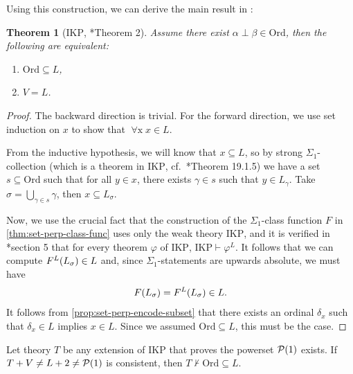 \documentclass[12pt,openany]{book}
\theoremstyle{plain}
\newtheorem{theorem}{Theorem}[section]
\theoremstyle{definition}
\newcommand\uplabel[1]{\textup{(#1)}}
\newcommand\opA[1]{\mathop{\forall #1}}
\newcommand\Pow{\mathcal{P}}
\newcommand\IKP{\mathrm{IKP}}
\newcommand\Ord{\mathrm{Ord}}
\begin{document}
Using this construction, we can derive the main result in \cite{wang-sw25-antichain-pre}:
\begin{theorem}[$\IKP$, \cite{wang-sw25-antichain-pre}*{Theorem 2}]
  \label{thm:set-perp-v-eq-l-equiv}
  Assume there exist $\alpha \perp \beta \in \Ord$, then the following are equivalent:
  \begin{enumerate}[label=\uplabel{\roman*}]
    \item $\Ord \subseteq L$,
    \item $V = L$.
  \end{enumerate}
\end{theorem}

\begin{proof}
  The backward direction is trivial. For the forward direction, we use set induction on $x$ to show that $\opA{x} x \in L$.

  From the inductive hypothesis, we will know that $x \subseteq L$, so by strong $\Sigma_1$-collection (which is a theorem in $\IKP$, cf.\ \cite{aczel-rathjen10-cst-book}*{Theorem 19.1.5}) we have a set $s \subseteq \Ord$ such that for all $y \in x$, there exists $\gamma \in s$ such that $y \in L_\gamma$. Take $\sigma = \bigcup_{\gamma \in s} \gamma$, then $x \subseteq L_\sigma$.

  Now, we use the crucial fact that the construction of the $\Sigma_1$-class function $F$ in \autoref{thm:set-perp-class-func} uses only the weak theory $\IKP$, and it is verified in \cite{matthews-rathjen24-constructible-universe}*{section 5} that for every theorem $\varphi$ of $\IKP$, $\IKP \vdash \varphi^L$. It follows that we can compute $F^L\mleft(L_\sigma\mright) \in L$ and, since $\Sigma_1$-statements are upwards absolute, we must have
  \[F\mleft(L_\sigma\mright) = F^L\mleft(L_\sigma\mright) \in L.\]
  It follows from \autoref{prop:set-perp-encode-subset} that there exists an ordinal $\delta_x$ such that $\delta_x \in L$ implies $x \in L$. Since we assumed $\Ord \subseteq L$, this must be the case.
\end{proof}

\begin{corollary}
  \label{cor:izf-2-not-pow-1-conseq}
  Let theory $T$ be any extension of $\IKP$ that proves the powerset $\Pow\mleft(1\mright)$ exists. If $T + V \neq L + 2 \neq \Pow\mleft(1\mright)$ is consistent, then $T \not\vdash \Ord \subseteq L$.
\end{corollary}
\end{document}

